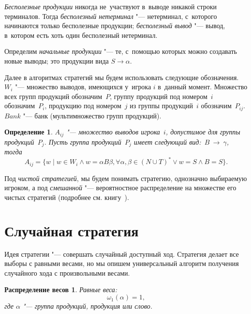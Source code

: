 \documentclass{csmathnotes}
\newtheorem{definition}{Определение}
\newtheorem{weight}{Распределение весов}
\begin{document}
\textit{Бесполезные продукции} никогда не~участвуют в~выводе никакой строки терминалов. Тогда \textit{бесполезный нетерминал} "--- нетерминал, с~которого начинаются только бесполезные продукции; \textit{бесполезный вывод} "--- вывод, в~котором есть хоть один бесполезный нетерминал.

Определим \textit{начальные продукции} "--- те, с~помощью которых можно создавать новые выводы; это продукции вида $S \rightarrow \alpha$.

Далее в алгоритмах стратегий мы будем использовать следующие обозначения. $W_i$ "--- множество выводов, имеющихся у~игрока $i$ в~данный момент. Множество всех групп продукций обозначим~$P$, группу продукций под номером~$i$ обозначим~$P_i$, продукцию под номером~$j$ из группы продукций~$i$ обозначим~$P_{ij}$. $Bank$ "--- банк (мультимножество групп продукций).

\begin{definition}
	$A_{ij}$ "--- множество выводов игрока~$i$, \emph{допустимое} для группы продукций~$P_j$. Пусть группа продукций~$P_j$ имеет следующий вид:~$B~\rightarrow~\gamma$, тогда \[A_{ij}=\{ w \mid w \in W_i \land w=\alpha B \beta, \forall \alpha , \beta \in (N \cup T)^* \lor w = S \land B=S\}.\]
\end{definition}

Под \textit{чистой стратегией}, мы будем понимать стратегию, однозначно выбираемую игроком, а под \textit{смешанной} "--- вероятностное распределение на множестве его чистых стратегий (подробнее см. книгу~\cite{Owen1971}).

\section*{Случайная стратегия}

Идея стратегии "--- совершать случайный доступный ход. Стратегия делает все выборы с равными весами, но мы опишем универсальный алгоритм получения случайного хода с произвольными весами.

\begin{weight}
	\label{weight1}
	Равные веса:\[\omega_1(\alpha) = 1,\] где $\alpha$ "--- группа продукций, продукция или слово.
\end{weight}
\end{document}
